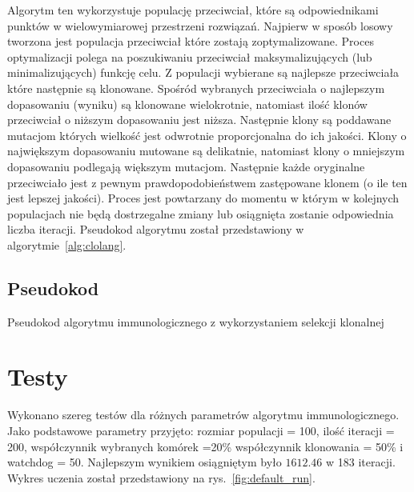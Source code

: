 \documentclass[a4paper]{article}
\begin{document}
Algorytm ten wykorzystuje populację przeciwciał, które są odpowiednikami punktów w wielowymiarowej przestrzeni rozwiązań.
Najpierw w sposób losowy tworzona jest populacja przeciwciał które zostają zoptymalizowane.
Proces optymalizacji polega na poszukiwaniu przeciwciał maksymalizujących (lub minimalizujących) funkcję celu.
Z populacji wybierane są najlepsze przeciwciała które następnie są klonowane.
Spośród wybranych przeciwciała o najlepszym dopasowaniu (wyniku) są klonowane wielokrotnie, natomiast ilość klonów przeciwciał o niższym dopasowaniu jest niższa.
Następnie klony są poddawane mutacjom których wielkość jest odwrotnie proporcjonalna do ich jakości. Klony o największym dopasowaniu mutowane są delikatnie, natomiast klony o mniejszym dopasowaniu podlegają większym mutacjom. Następnie każde oryginalne przeciwciało jest z pewnym prawdopodobieństwem zastępowane klonem (o ile ten jest lepszej jakości). Proces jest powtarzany do momentu w którym w kolejnych populacjach nie będą dostrzegalne zmiany lub osiągnięta zostanie odpowiednia liczba iteracji.
Pseudokod algorytmu został przedstawiony w algorytmie~\ref{alg:clolang}.

\subsection{Pseudokod}
\begin{algorithm}[H]
\label{alg:clolang}
\SetAlgoLined
\caption{Pseudokod algorytmu immunologicznego z wykorzystaniem selekcji klonalnej}
\end{algorithm}

\section{Testy}

Wykonano szereg testów dla różnych parametrów algorytmu immunologicznego. 
Jako podstawowe parametry przyjęto: rozmiar populacji = 100, ilość iteracji = 200, współczynnik wybranych komórek =20\% współczynnik klonowania = 50\% i watchdog = 50.
Najlepszym wynikiem osiągniętym było $1612.46$ w 183 iteracji. Wykres uczenia został przedstawiony na rys.~\ref{fig:default_run}.
\end{document}
